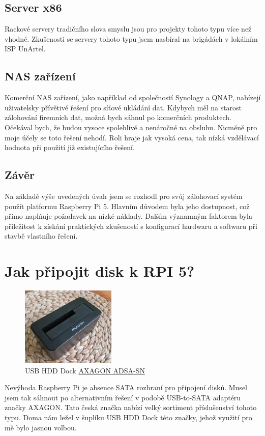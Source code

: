 \documentclass[a4paper,12pt, oneside]{book}
\begin{document}
\subsection{Server x86}

Rackové servery tradičního slova smyslu jsou pro projekty tohoto typu
více než vhodné. Zkušenosti se servery tohoto typu
jsem nasbíral na brigádách v lokálním ISP UnArtel. 

\subsection{NAS zařízení}

Komerční NAS zařízení, jako například od společností Synology a QNAP, nabízejí
uživatelsky přívětivé řešení pro síťové ukládání dat. Kdybych 
měl na starost zálohování firemních dat, možná bych sáhnul po komerčních
produktech. Očekával bych, že budou vysoce spolehlivé a nenáročné na obsluhu.
Nicméně pro moje účely se toto řešení nehodí. Roli hraje jak vysoká cena,
tak nízká vzdělávací hodnota při použití již existujícího řešení.

\subsection{Závěr}



Na základě výše uvedených úvah jsem se rozhodl pro svůj zálohovací systém použít
platformu Raspberry Pi 5. Hlavním důvodem byla jeho dostupnost, což přímo
naplňuje požadavek na nízké náklady. Dalším významným faktorem byla příležitost
k získání praktických zkušeností s konfigurací hardwaru a softwaru při stavbě
vlastního řešení.


\section{Jak připojit disk k RPI 5?}

\begin{figure}
	\centering
	\includegraphics[width=0.4\textwidth]{img/axagon.jpg}
	\caption{USB HDD Dock \href{https://www.axagon.eu/produkty/adsa-sn}{AXAGON ADSA-SN}}
\end{figure}
Nevýhoda Raspberry Pi je absence SATA rozhraní pro připojení disků.
Musel jsem tak sáhnout po alternativním řešení v podobě 
USB-to-SATA adaptéru značky AXAGON. Tato česká značka nabízí 
velký sortiment příslušenství tohoto typu. Doma nám ležel v šuplíku
USB HDD Dock této značky, jehož využití pro mě 
bylo jasnou volbou.
\end{document}
